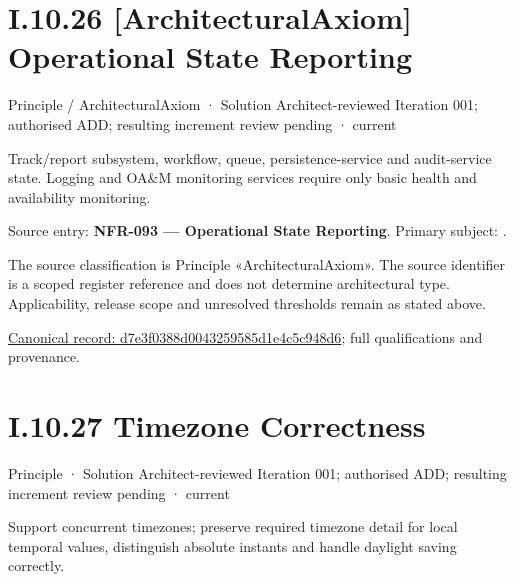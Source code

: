 \section*{I.10.26 [ArchitecturalAxiom] Operational State Reporting}
\label{navigation:I.10.26}

\label{element:d7e3f0388d0043259585d1e4c5c948d6}
{\small Principle / ArchitecturalAxiom · Solution Architect-reviewed Iteration 001; authorised ADD; resulting increment review pending · current}\par

Track/report subsystem, workflow, queue, persistence-service and audit-service state. Logging and OA\&M monitoring services require only basic health and availability monitoring.



Source entry: \textbf{NFR-093 — Operational State Reporting}. Primary subject: \texttt{}.



The source classification is Principle «ArchitecturalAxiom». The source identifier is a scoped register reference and does not determine architectural type. Applicability, release scope and unresolved thresholds remain as stated above.


{\footnotesize \href{../../../../../../../../continuum/motivation/principle/architectural-axiom/d7e3f0388d0043259585d1e4c5c948d6.md}{Canonical record: d7e3f0388d0043259585d1e4c5c948d6}; full qualifications and provenance.}\par
\section*{I.10.27 Timezone Correctness}
\label{navigation:I.10.27}

\label{element:3da1fba95a00438db09c342dfba8b693}
{\small Principle · Solution Architect-reviewed Iteration 001; authorised ADD; resulting increment review pending · current}\par

Support concurrent timezones; preserve required timezone detail for local temporal values, distinguish absolute instants and handle daylight saving correctly.



